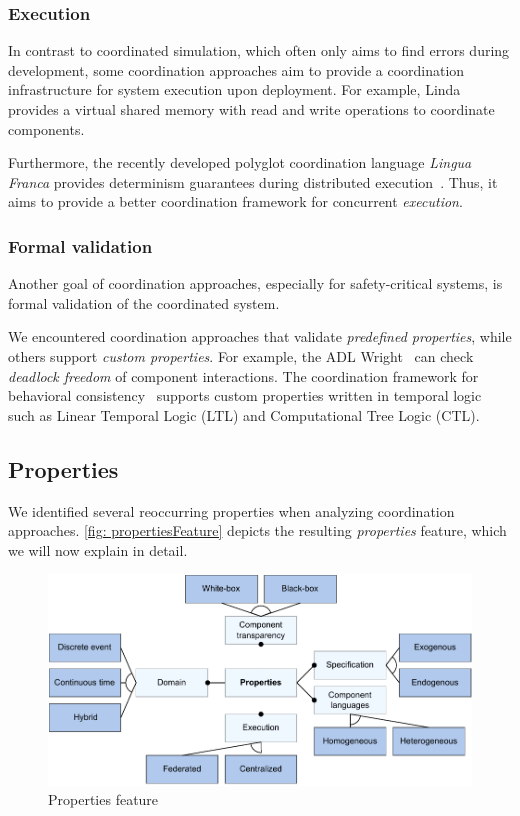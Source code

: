 \documentclass[runningheads]{llncs}
\begin{document}
\subsubsection{Execution} In contrast to coordinated simulation, which often only aims to find errors during development, some coordination approaches aim to provide a coordination infrastructure for system execution upon deployment.
For example, Linda provides a virtual shared memory with read and write operations to coordinate components.

Furthermore, the recently developed polyglot coordination language \textit{Lingua Franca} provides determinism guarantees during distributed execution~\cite{lohstrohLinguaFrancaDeterministic2021}.
Thus, it aims to provide a better coordination framework for concurrent \textit{execution}.


\subsubsection{Formal validation} Another goal of coordination approaches, especially for safety-critical systems, is formal validation of the coordinated system.

We encountered coordination approaches that validate \textit{predefined properties}, while others support \textit{custom properties}.
For example, the ADL Wright~\cite{allenFormalBasisArchitectural1997} can check \textit{deadlock freedom} of component interactions.
The coordination framework for behavioral consistency~\cite{krauterBehavioralConsistencyMultimodeling2023} supports custom properties written in temporal logic such as Linear Temporal Logic (LTL) and Computational Tree Logic (CTL).

\subsection{Properties}
We identified several reoccurring properties when analyzing coordination approaches.
\autoref{fig: propertiesFeature} depicts the resulting \textit{properties} feature, which we will now explain in detail.

\begin{figure}[ht]
	\centering
	\includegraphics[width=1\textwidth]{images/properties_feature}
	\caption{Properties feature}
	\label{fig: propertiesFeature}
\end{figure}
\end{document}
